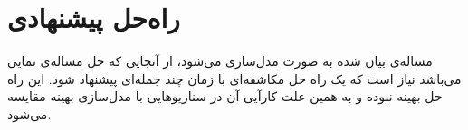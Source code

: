 \chapter{راه‌حل پیشنهادی}

مساله‌ی بیان شده به صورت 
مدل‌سازی می‌شود، از آنجایی که حل مساله‌ی 
نمایی می‌باشد نیاز است که یک راه حل مکاشفه‌ای با زمان چند جمله‌ای
پیشنهاد شود. این راه حل بهینه نبوده و به همین علت کارآیی آن
در سناریوهایی با مدل‌سازی بهینه مقایسه می‌شود.